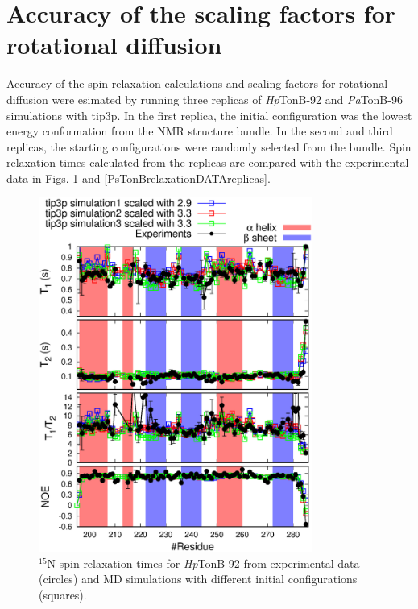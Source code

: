 \documentclass[journal=jpcbfk]{achemso}
\begin{document}
\newpage

\section{Accuracy of the scaling factors for rotational diffusion}
Accuracy of the spin relaxation calculations and scaling factors for rotational diffusion
were esimated by running three replicas of {\it Hp}TonB-92 and {\it Pa}TonB-96 simulations with tip3p.
In the first replica, the initial configuration was the lowest energy conformation from the NMR structure bundle.
In the second and third replicas, the starting configurations were randomly selected from the bundle.
Spin relaxation times calculated from the replicas are compared with the experimental data
in Figs. \ref{HpTonBrelaxationDATAreplicas} and \ref{PsTonBrelaxationDATAreplicas}.
\begin{figure}[!b]
  \includegraphics[width=9cm]{../Figs/HpTonBrelaxationDATAreplicas.eps}%
  \caption{$^{15}$N spin relaxation times for {\it Hp}TonB-92 from experimental data (circles)
    and MD simulations with different initial configurations (squares). \label{HpTonBrelaxationDATAreplicas}}
\end{figure}
\end{document}
